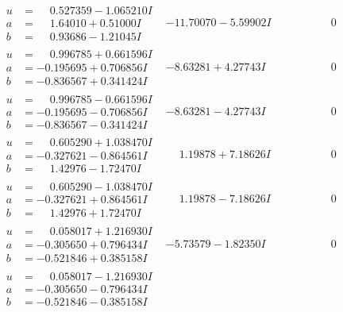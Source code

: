 \documentclass[1p]{elsarticle_modified}
\theoremstyle{definition}
\begin{document}
$$\begin{array}{c|c|c}
\begin{aligned}
u &= \phantom{-}0.527359 - 1.065210 I \\
a &= \phantom{-}1.64010 + 0.51000 I \\
b &= \phantom{-}0.93686 - 1.21045 I\end{aligned}
 & -11.70070 - 5.59902 I & \phantom{-0.000000 } 0 \\ \hline\begin{aligned}
u &= \phantom{-}0.996785 + 0.661596 I \\
a &= -0.195695 + 0.706856 I \\
b &= -0.836567 + 0.341424 I\end{aligned}
 & -8.63281 + 4.27743 I & \phantom{-0.000000 } 0 \\ \hline\begin{aligned}
u &= \phantom{-}0.996785 - 0.661596 I \\
a &= -0.195695 - 0.706856 I \\
b &= -0.836567 - 0.341424 I\end{aligned}
 & -8.63281 - 4.27743 I & \phantom{-0.000000 } 0 \\ \hline\begin{aligned}
u &= \phantom{-}0.605290 + 1.038470 I \\
a &= -0.327621 - 0.864561 I \\
b &= \phantom{-}1.42976 - 1.72470 I\end{aligned}
 & \phantom{-}1.19878 + 7.18626 I & \phantom{-0.000000 } 0 \\ \hline\begin{aligned}
u &= \phantom{-}0.605290 - 1.038470 I \\
a &= -0.327621 + 0.864561 I \\
b &= \phantom{-}1.42976 + 1.72470 I\end{aligned}
 & \phantom{-}1.19878 - 7.18626 I & \phantom{-0.000000 } 0 \\ \hline\begin{aligned}
u &= \phantom{-}0.058017 + 1.216930 I \\
a &= -0.305650 + 0.796434 I \\
b &= -0.521846 + 0.385158 I\end{aligned}
 & -5.73579 - 1.82350 I & \phantom{-0.000000 } 0 \\ \hline\begin{aligned}
u &= \phantom{-}0.058017 - 1.216930 I \\
a &= -0.305650 - 0.796434 I \\
b &= -0.521846 - 0.385158 I\end{aligned}

\end{array}$$
\end{document}
